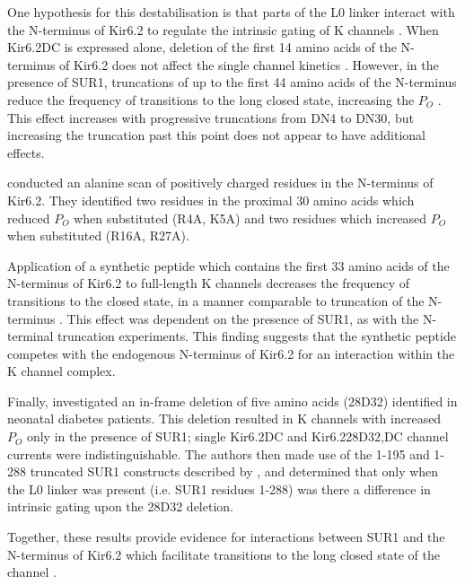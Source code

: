 One hypothesis for this destabilisation is that parts of the L0 linker interact with the N-terminus of Kir6.2 to regulate the intrinsic gating of K\ATP{} channels \cite{koster_atp_1999, babenko_n-terminus_1999, reimann_involvement_1999-1, babenko_sur-dependent_2002}.
When Kir6.2\textgreek{D}C is expressed alone, deletion of the first 14 amino acids of the N-terminus of Kir6.2 does not affect the single channel kinetics \cite{reimann_involvement_1999-1}.
However, in the presence of SUR1, truncations of up to the first 44 amino acids of the N-terminus reduce the frequency of transitions to the long closed state, increasing the $P_O$ \cite{reimann_involvement_1999-1, koster_atp_1999, babenko_n-terminus_1999}.
This effect increases with progressive truncations from \textgreek{D}N4 to \textgreek{D}N30, but increasing the truncation past this point does not appear to have additional effects.

\textcite{cukras_role_2002} conducted an alanine scan of positively charged residues in the N-terminus of Kir6.2.
They identified two residues in the proximal 30 amino acids which reduced $P_O$ when substituted (R4A, K5A) and two residues which increased $P_O$ when substituted (R16A, R27A).

Application of a synthetic peptide which contains the first 33 amino acids of the N-terminus of Kir6.2 to full-length K\ATP{} channels decreases the frequency of transitions to the closed state, in a manner comparable to truncation of the N-terminus \cite{babenko_sur-dependent_2002}.
This effect was dependent on the presence of SUR1, as with the N-terminal truncation experiments.
This finding suggests that the synthetic peptide competes with the endogenous N-terminus of Kir6.2 for an interaction within the K\ATP{} channel complex.

Finally, \textcite{craig_-frame_2009} investigated an in-frame deletion of five amino acids (28\textgreek{D}32) identified in neonatal diabetes patients.
This deletion resulted in K\ATP{} channels with increased $P_O$ only in the presence of SUR1; single Kir6.2\textgreek{D}C and Kir6.228\textgreek{D}32,\textgreek{D}C channel currents were indistinguishable.
The authors then made use of the 1-195 and 1-288 truncated SUR1 constructs described by \textcite{babenko_sur_2003}, and determined that only when the L0 linker was present (i.e. SUR1 residues 1-288) was there a difference in intrinsic gating upon the 28\textgreek{D}32 deletion.

Together, these results provide evidence for interactions between SUR1 and the N-terminus of Kir6.2 which facilitate transitions to the long closed state of the channel \cite{babenko_sur_2003}.


